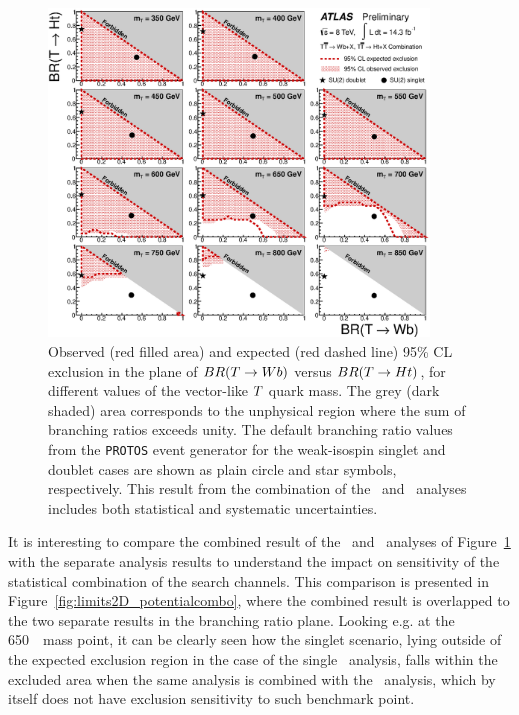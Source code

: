 \begin{figure}[h!bt]
\centering
\includegraphics[width=0.9\textwidth]{results/figures/lim_Scan2D_comb.eps}
\caption{
Observed (red filled area) and expected (red dashed line) 95\% CL exclusion in the plane of
$BR(\T \to Wb)$ versus $BR(\T \to Ht)$, for different values of the vector-like $\T$ quark mass.
The grey (dark shaded) area corresponds to the unphysical region where the sum of branching ratios exceeds unity. 
The default branching ratio values from the \texttt{PROTOS} event generator for the weak-isospin singlet and doublet cases 
are shown as plain circle and star symbols, respectively. This result  from the combination of
the \wbx\ and \htx\ analyses includes both statistical and systematic uncertainties.
\label{fig:limits2D_combo}}
\end{figure}

It is interesting to compare the 
combined result
of the \wbx\ and \htx\ analyses
of Figure~\ref{fig:limits2D_combo} 
with the separate analysis results
to understand the impact on sensitivity
of the statistical combination of
the search channels.
This comparison is presented in 
Figure~\ref{fig:limits2D_potentialcombo},
where the combined result is overlapped
to the two separate results in the branching ratio
plane.
Looking e.g. at the 650~\gev\ mass point,
it can be clearly seen how the singlet
scenario, lying outside of the expected exclusion
region in the case of the single \htx\ analysis,
falls within the excluded area when
the same analysis is combined with the
\wbx\ analysis, which by itself does not 
have exclusion sensitivity to such benchmark point.


